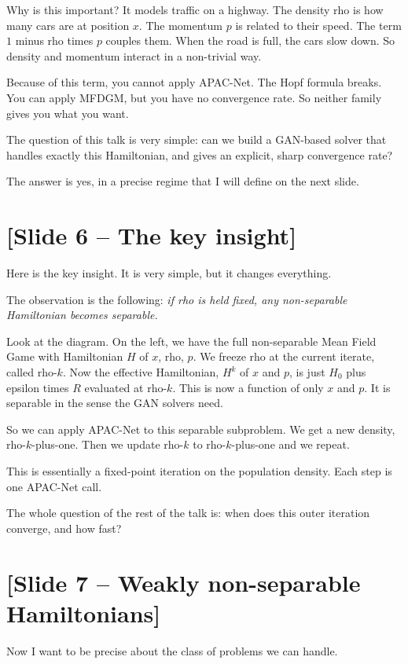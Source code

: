 \documentclass[11pt]{article}
\begin{document}
Why is this important? It models traffic on a highway. The density rho is
how many cars are at position $x$. The momentum $p$ is related to their speed.
The term $1$ minus rho times $p$ couples them. When the road is full, the
cars slow down. So density and momentum interact in a non-trivial way.

Because of this term, you cannot apply APAC-Net. The Hopf formula breaks.
You can apply MFDGM, but you have no convergence rate. So neither family
gives you what you want.

The question of this talk is very simple: can we build a GAN-based solver
that handles exactly this Hamiltonian, and gives an explicit, sharp
convergence rate?

The answer is yes, in a precise regime that I will define on the next slide.

\section*{[Slide 6 -- The key insight]}

Here is the key insight. It is very simple, but it changes everything.

The observation is the following: \emph{if rho is held fixed, any non-separable
Hamiltonian becomes separable.}

Look at the diagram. On the left, we have the full non-separable Mean Field
Game with Hamiltonian $H$ of $x$, rho, $p$. We freeze rho at the current
iterate, called rho-$k$. Now the effective Hamiltonian, $H^k$ of $x$ and $p$,
is just $H_0$ plus epsilon times $R$ evaluated at rho-$k$. This is now a
function of only $x$ and $p$. It is separable in the sense the GAN solvers
need.

So we can apply APAC-Net to this separable subproblem. We get a new density,
rho-$k$-plus-one. Then we update rho-$k$ to rho-$k$-plus-one and we repeat.

This is essentially a fixed-point iteration on the population density. Each
step is one APAC-Net call.

The whole question of the rest of the talk is: when does this outer iteration
converge, and how fast?

\section*{[Slide 7 -- Weakly non-separable Hamiltonians]}

Now I want to be precise about the class of problems we can handle.
\end{document}
